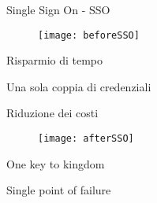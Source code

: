 \begin{tframe}{Single Sign On - SSO}
\begin{center}
\begin{minipage}{0.45\textwidth}
\begin{figure}[h]
\centering
\texttt{[image: beforeSSO]}
\end{figure}
{\fontsize{7pt}{7.2}\selectfont
\begin{adv}
\item Risparmio di tempo
\item Una sola coppia di credenziali
\item Riduzione dei costi
\end{adv}
}
\end{minipage}
\begin{minipage}{0.45\textwidth}
\begin{figure}[h]
\centering
\texttt{[image: afterSSO]}
\end{figure}
{\fontsize{7pt}{7.2}\selectfont
\begin{disadv}
\item One key to kingdom
\item Single point of failure
\end{disadv}
}
\end{minipage}
\end{center}
\end{tframe}